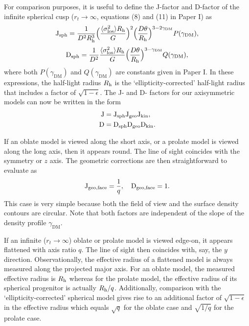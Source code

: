 \documentclass[prd,twocolumn,showpacs,preprintnumbers,superscriptaddress,nofootinbib,amsmath,amssymb,nobalancelastpage]{revtex4}
\def\rh{R_{\rm h}}
\newcommand{\Df}{{\rm D}}
\newcommand{\Jf}{{\rm J}}
\begin{document}
For comparison purposes, it is useful to define the J-factor and
D-factor of the infinite spherical cusp ($r_t\rightarrow\infty$, equations (8) and (11) in Paper I) as
%
\begin{equation}
\Jf_{\rm sph} =   \frac{1}{D^2\rh^3}\Big(\frac{\langle\sigma_{\rm los}^2\rangle\rh}{G}\Big)^2\Big({ D\theta\over \rh}\Big)^{3-2\gamma_\mathrm{DM}} P(\gamma_\mathrm{DM}),
\end{equation}
%
%
\begin{equation}
\Df_{\rm sph} =   \frac{1}{D^2}\frac{\langle\sigma_{\rm los}^2\rangle\rh}{G}\Big({ D\theta\over \rh}\Big)^{3-\gamma_\mathrm{DM}} Q(\gamma_\mathrm{DM}),
\end{equation}
%
where both $P(\gamma_\mathrm{DM})$ and $Q(\gamma_\mathrm{DM})$ are constants given in Paper
I. In these expressions, the half-light radius $\rh$ is the `ellipticity-corrected' half-light radius that includes a factor of $\sqrt{1-\epsilon}$. The J- and D- factors for our axisymmetric models can now be
written in the form
%
\begin{equation}
\begin{split}
\Jf &= \Jf_{\rm sph}\Jf_{\rm geo}\Jf_{\rm kin},\\
\Df &= \Df_{\rm sph}\Df_{\rm geo}\Df_{\rm kin}.
\end{split}
\end{equation}
%

If an oblate model is viewed along the short axis, or a prolate model
is viewed along the long axis, then it appears round. The line of
sight coincides with the symmetry or $z$ axis. The geometric
corrections are then straightforward to evaluate as
\begin{equation}
 \Jf_{\rm geo,face} = {1 \over q},\quad\Df_{\rm geo,face} = {1}.
 \label{eq:Joblateshort}
 \end{equation}
This case is very simple because both the field of view and the
surface density contours are circular. Note that both factors are independent of the slope of the density profile $\gamma_\mathrm{DM}$.

If an infinite ($r_t\rightarrow\infty$) oblate or prolate model is viewed edge-on, it appears flattened
with axis ratio $q$. The line of sight then coincides with, say, the
$y$ direction. Observationally, the effective radius of a flattened model is
always measured along the projected major axis.  For an oblate model, the measured effective radius is $\rh$ whereas for the prolate model, the effective radius of its spherical progenitor is actually
$\rh/q$. Additionally, comparison with the `ellipticity-corrected' spherical model gives rise to an additional factor of $\sqrt{1-\epsilon}$ in the effective radius which equals $\sqrt{q}$ for the oblate case and $\sqrt{1/q}$ for the prolate case.
\end{document}

